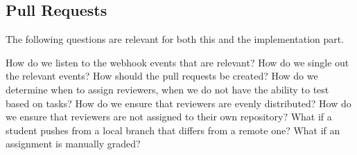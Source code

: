 \subsection{Pull Requests}

The following questions are relevant for both this and the implementation part.

How do we listen to the webhook events that are relevant?
How do we single out the relevant events?
How should the pull requests be created?
How do we determine when to assign reviewers, when we do not have the ability to test based on tasks?
How do we ensure that reviewers are evenly distributed?
How do we ensure that reviewers are not assigned to their own repository?
What if a student pushes from a local branch that differs from a remote one?
What if an assignment is manually graded?
